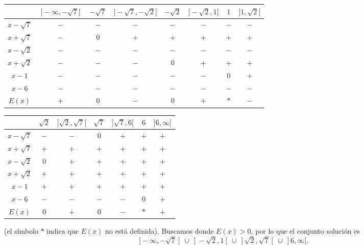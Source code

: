 \documentclass[11pt]{article}
\begin{document}
\begin{center}
\renewcommand{\arraystretch}{1.3}
\begin{tabular}{|c|c|c|c|c|c|c|c|}
\hline
 & $\;]-\infty,-\sqrt{7}[\;$ & $-\sqrt{7}$ & $]-\sqrt{7},-\sqrt{2}[$ & $-\sqrt{2}$ & $]-\sqrt{2},1[$ & $1$ & $]1,\sqrt{2}[$ \\
\hline
$x-\sqrt{7}$   & $-$ & $-$ & $-$ & $-$ & $-$ & $-$ & $-$ \\
$x+\sqrt{7}$   & $-$ & $0$ & $+$ & $+$ & $+$ & $+$ & $+$ \\
$x-\sqrt{2}$   & $-$ & $-$ & $-$ & $-$ & $-$ & $-$ & $-$ \\
$x+\sqrt{2}$   & $-$ & $-$ & $-$ & $0$ & $+$ & $+$ & $+$ \\
$x-1$          & $-$ & $-$ & $-$ & $-$ & $-$ & $0$ & $+$ \\
$x-6$          & $-$ & $-$ & $-$ & $-$ & $-$ & $-$ & $-$ \\
\hline
$E(x)$         & $+$ & $0$ & $-$ & $0$ & $+$ & $*$ & $-$ \\
\hline
\end{tabular}
\end{center}

\begin{center}
\renewcommand{\arraystretch}{1.3}
\begin{tabular}{|c|c|c|c|c|c|c|}
\hline
 & $\sqrt{2}$ & $]\sqrt{2},\sqrt{7}[$ & $\sqrt{7}$ & $]\sqrt{7},6[$ & $6$ & $]6,\infty[$ \\
\hline
$x-\sqrt{7}$   & $-$ & $-$ & $0$ & $+$ & $+$ & $+$ \\
$x+\sqrt{7}$   & $+$ & $+$ & $+$ & $+$ & $+$ & $+$ \\
$x-\sqrt{2}$   & $0$ & $+$ & $+$ & $+$ & $+$ & $+$ \\
$x+\sqrt{2}$   & $+$ & $+$ & $+$ & $+$ & $+$ & $+$ \\
$x-1$          & $+$ & $+$ & $+$ & $+$ & $+$ & $+$ \\
$x-6$          & $-$ & $-$ & $-$ & $-$ & $0$ & $+$ \\
\hline
$E(x)$         & $0$ & $+$ & $0$ & $-$ & $*$ & $+$ \\
\hline
\end{tabular}
\end{center}

(el símbolo $*$ indica que $E(x)$ no está definida). Buscamos donde $E(x) > 0$, por lo que el
conjunto solución es
\[
]-\infty,-\sqrt{7}[\ \cup\ ]-\sqrt{2},1[\ \cup\ ]\sqrt{2},\sqrt{7}[\ \cup\ ]6,\infty[.
\]
\end{document}
